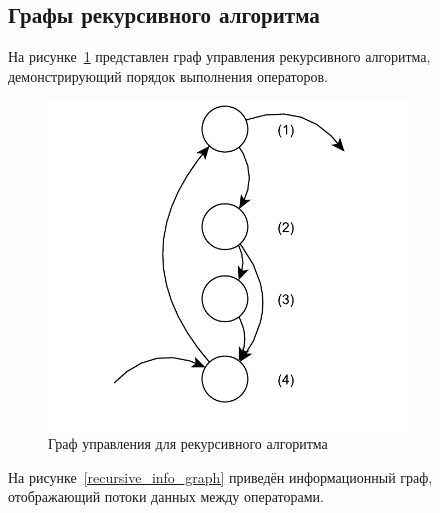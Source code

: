 \subsection{Графы рекурсивного алгоритма}

На рисунке~\ref{recursive_control_graph} представлен граф управления рекурсивного алгоритма, демонстрирующий порядок выполнения операторов.

\begin{figure}[H]
	\centering
	\includegraphics[width=0.85\textwidth,height=0.5\textheight,keepaspectratio]{images/recursive_control_graph}
	\caption{Граф управления для рекурсивного алгоритма}
	\label{recursive_control_graph}
\end{figure}

На рисунке~\ref{recursive_info_graph} приведён информационный граф, отображающий потоки данных между операторами.

